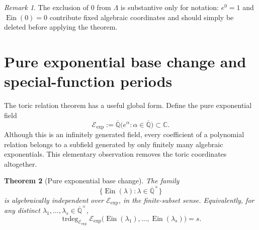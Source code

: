 \documentclass[11pt]{article}
\newtheorem{theorem}{Theorem}[section]
\theoremstyle{definition}
\theoremstyle{remark}
\newtheorem{remark}[theorem]{Remark}
\newcommand{\Qbar}{\overline{\mathbb Q}}
\newcommand{\C}{\mathbb C}
\newcommand{\Ein}{\operatorname{Ein}}
\newcommand{\Cin}{\operatorname{Cin}}
\newcommand{\Eexp}{\mathcal E_{\mathrm{exp}}}
\newcommand{\Si}{\operatorname{Si}}
\newcommand{\Shi}{\operatorname{Shi}}
\newcommand{\Cinh}{\operatorname{Cinh}}
\begin{document}
\begin{remark}
The exclusion of \(0\) from \(\Lambda\) is substantive only for notation:
\(e^0=1\) and \(\Ein(0)=0\) contribute fixed algebraic coordinates and should
simply be deleted before applying the theorem.
\end{remark}


\providecommand{\Si}{\operatorname{Si}}
\providecommand{\Cin}{\operatorname{Cin}}
\providecommand{\Shi}{\operatorname{Shi}}
\providecommand{\Cinh}{\operatorname{Cinh}}
\providecommand{\Eexp}{\mathcal E_{\mathrm{exp}}}

\section{Pure exponential base change and special-function periods}
\label{sec:efunction-consequences}

The toric relation theorem has a useful global form.  Define the pure
exponential field
\begin{equation}\label{eq:pure-exponential-field}
 \Eexp:=\Qbar\bigl(e^\alpha:\alpha\in\Qbar\bigr)\subset\C.
\end{equation}
Although this is an infinitely generated field, every coefficient of a
polynomial relation belongs to a subfield generated by only finitely many
algebraic exponentials.  This elementary observation removes the toric
coordinates altogether.

\begin{theorem}[Pure exponential base change]\label{thm:pure-exp-base}
The family
\[
 \bigl\{\Ein(\lambda):\lambda\in\Qbar^\times\bigr\}
\]
is algebraically independent over \(\Eexp\), in the finite-subset sense.
Equivalently, for any distinct
\(\lambda_1,\ldots,\lambda_s\in\Qbar^\times\),
\[
 \operatorname{trdeg}_{\Eexp}
 \Eexp\bigl(\Ein(\lambda_1),\ldots,\Ein(\lambda_s)\bigr)=s.
\]
\end{theorem}
\end{document}
